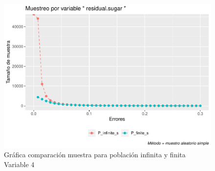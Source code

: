 \documentclass[
]{article}
\begin{document}
\begin{figure}
\centering
\includegraphics{1_examen_solucion_files/figure-latex/grafica va4-1.pdf}
\caption{Gráfica comparación muestra para población infinita y finita
Variable 4}
\end{figure}
\end{document}
